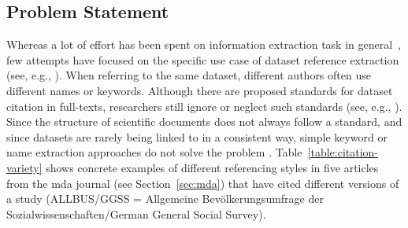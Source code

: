 \documentclass{IOS-Book-Article}
\begin{document}
\subsection{Problem Statement}
Whereas a lot of effort has been spent on information extraction task in general~\citep{Sarawagi2007}, few attempts have focused on the specific use case of dataset reference extraction (see, e.g., \citep{MeiyuLu2012}). %
When referring to the same dataset, different authors often use different names or keywords.
Although there are proposed standards for dataset citation in full-texts, researchers still ignore or neglect such standards (see, e.g., \cite{altman2007proposed}).
Since the structure of scientific documents does not always follow a standard, and since datasets are rarely being linked to in a consistent way,
simple keyword or name extraction approaches do not solve the problem \citep{Nadeau2007}. 
Table~\ref{table:citation-variety} shows concrete examples of different referencing styles in five articles from the mda journal (see Section~\ref{sec:mda}) that have cited different versions of a study (ALLBUS/GGSS = Allgemeine Bev\"olkerungsumfrage der Sozialwissenschaften/German General Social Survey).
\end{document}
